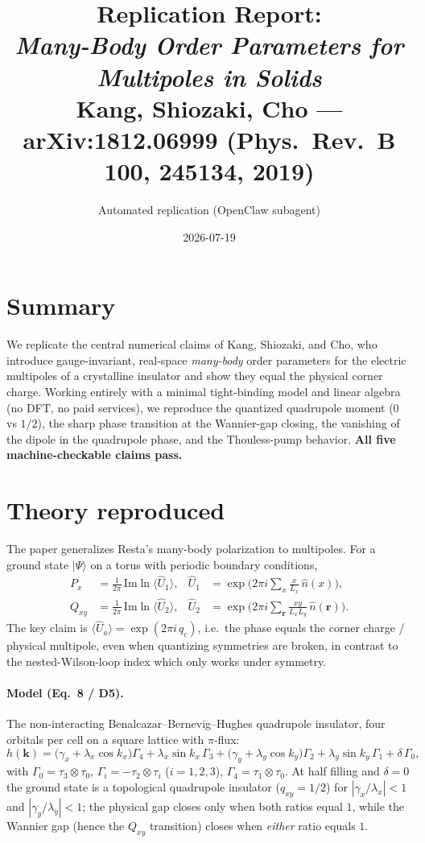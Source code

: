 \documentclass[11pt]{article}
\title{Replication Report:\\ \emph{Many-Body Order Parameters for Multipoles in Solids}\\
\normalsize Kang, Shiozaki, Cho --- arXiv:1812.06999 (Phys.\ Rev.\ B \textbf{100}, 245134, 2019)}
\author{Automated replication (OpenClaw subagent)}
\date{2026-07-19}
\begin{document}
\maketitle

\section{Summary}
We replicate the central numerical claims of Kang, Shiozaki, and Cho, who
introduce gauge-invariant, real-space \emph{many-body} order parameters for the
electric multipoles of a crystalline insulator and show they equal the physical
corner charge. Working entirely with a minimal tight-binding model and linear
algebra (no DFT, no paid services), we reproduce the quantized quadrupole moment
($0$ vs $1/2$), the sharp phase transition at the Wannier-gap closing, the
vanishing of the dipole in the quadrupole phase, and the Thouless-pump behavior.
\textbf{All five machine-checkable claims pass.}

\section{Theory reproduced}
The paper generalizes Resta's many-body polarization to multipoles. For a
ground state $|\Psi\rangle$ on a torus with periodic boundary conditions,
\begin{align}
P_x &= \tfrac{1}{2\pi}\,\mathrm{Im}\ln\langle \hat U_1\rangle, &
 \hat U_1 &= \exp\!\Big(2\pi i \sum_x \tfrac{x}{L_x}\,\hat n(x)\Big), \tag{Eq.~1}\\
Q_{xy} &= \tfrac{1}{2\pi}\,\mathrm{Im}\ln\langle \hat U_2\rangle, &
 \hat U_2 &= \exp\!\Big(2\pi i \sum_{\mathbf r} \tfrac{xy}{L_xL_y}\,\hat n(\mathbf r)\Big). \tag{Eq.~2}
\end{align}
The key claim is $\langle\hat U_a\rangle=\exp(2\pi i\,q_c)$, i.e.\ the phase
equals the corner charge / physical multipole, even when quantizing symmetries
are broken, in contrast to the nested-Wilson-loop index which only works under
symmetry.

\paragraph{Model (Eq.~8 / D5).} The non-interacting Benalcazar--Bernevig--Hughes
quadrupole insulator, four orbitals per cell on a square lattice with $\pi$-flux:
\begin{equation}
h(\mathbf k)=\big(\gamma_x+\lambda_x\cos k_x\big)\Gamma_4+\lambda_x\sin k_x\,\Gamma_3
+\big(\gamma_y+\lambda_y\cos k_y\big)\Gamma_2+\lambda_y\sin k_y\,\Gamma_1+\delta\,\Gamma_0,
\end{equation}
with $\Gamma_0=\tau_3\!\otimes\!\tau_0$, $\Gamma_i=-\tau_2\!\otimes\!\tau_i$
($i=1,2,3$), $\Gamma_4=\tau_1\!\otimes\!\tau_0$. At half filling and $\delta=0$
the ground state is a topological quadrupole insulator ($q_{xy}=1/2$) for
$|\gamma_x/\lambda_x|<1$ and $|\gamma_y/\lambda_y|<1$; the physical gap closes
only when both ratios equal $1$, while the Wannier gap (hence the $Q_{xy}$
transition) closes when \emph{either} ratio equals $1$.
\end{document}
